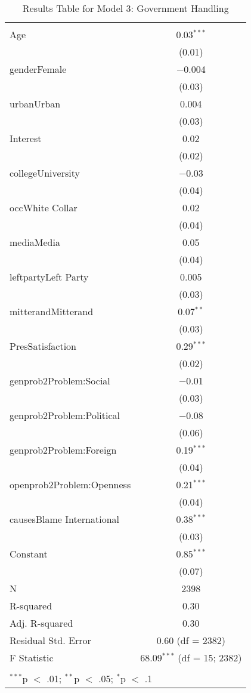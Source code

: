 
\begin{table}[!htbp] \centering 
  \caption{Results Table for Model 3: Government Handling} 
  \label{} 
\footnotesize 
\begin{tabular}{@{\extracolsep{5pt}}lc} 
\\[-1.8ex]\hline \\[-1.8ex] 
\hline \\[-1.8ex] 
 Age & 0.03$^{***}$ \\ 
  & (0.01) \\ 
  genderFemale & $-$0.004 \\ 
  & (0.03) \\ 
  urbanUrban & 0.004 \\ 
  & (0.03) \\ 
  Interest & 0.02 \\ 
  & (0.02) \\ 
  collegeUniversity & $-$0.03 \\ 
  & (0.04) \\ 
  occWhite Collar & 0.02 \\ 
  & (0.04) \\ 
  mediaMedia & 0.05 \\ 
  & (0.04) \\ 
  leftpartyLeft Party & 0.005 \\ 
  & (0.03) \\ 
  mitterandMitterand & 0.07$^{**}$ \\ 
  & (0.03) \\ 
  PresSatisfaction & 0.29$^{***}$ \\ 
  & (0.02) \\ 
  genprob2Problem:Social & $-$0.01 \\ 
  & (0.03) \\ 
  genprob2Problem:Political & $-$0.08 \\ 
  & (0.06) \\ 
  genprob2Problem:Foreign & 0.19$^{***}$ \\ 
  & (0.04) \\ 
  openprob2Problem:Openness & 0.21$^{***}$ \\ 
  & (0.04) \\ 
  causesBlame International & 0.38$^{***}$ \\ 
  & (0.03) \\ 
  Constant & 0.85$^{***}$ \\ 
  & (0.07) \\ 
 N & 2398 \\ 
R-squared & 0.30 \\ 
Adj. R-squared & 0.30 \\ 
Residual Std. Error & 0.60 (df = 2382) \\ 
F Statistic & 68.09$^{***}$ (df = 15; 2382) \\ 
\hline \\[-1.8ex] 
\multicolumn{2}{l}{$^{***}$p $<$ .01; $^{**}$p $<$ .05; $^{*}$p $<$ .1} \\ 
\end{tabular} 
\end{table} 
